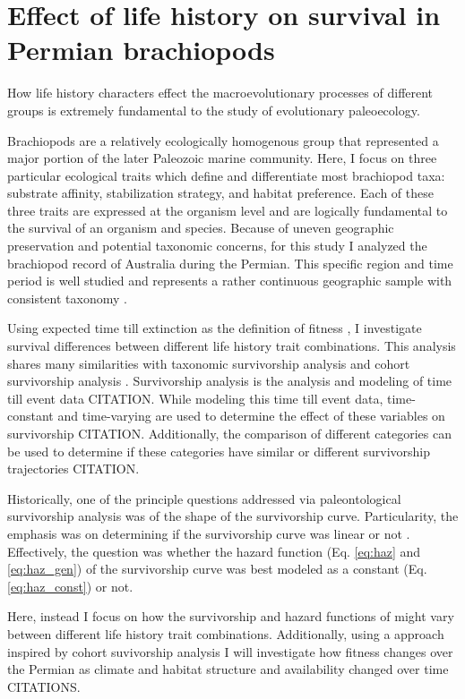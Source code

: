 \documentclass[12pt,letterpaper]{article}
\begin{document}
\section{Effect of life history on survival in Permian brachiopods}

How life history characters effect the macroevolutionary processes of different groups is extremely fundamental to the study of evolutionary paleoecology.

Brachiopods are a relatively ecologically homogenous group that represented a major portion of the later Paleozoic marine community. Here, I focus on three particular ecological traits which define and differentiate most brachiopod taxa: substrate affinity, stabilization strategy, and habitat preference. Each of these three traits are expressed at the organism level and are logically fundamental to the survival of an organism and species. Because of uneven geographic preservation and potential taxonomic concerns, for this study I analyzed the brachiopod record of Australia during the Permian. This specific region and time period is well studied and represents a rather continuous geographic sample with consistent taxonomy \citep{Clapham2008a,Clapham2012,Clapham2007}.

Using expected time till extinction as the definition of fitness \citep{Cooper1984}, I investigate survival differences between different life history trait combinations. This analysis shares many similarities with taxonomic survivorship analysis \citep{VanValen1973,VanValen1979} and cohort survivorship analysis \citep{Raup1978}. Survivorship analysis is the analysis and modeling of time till event data CITATION. While modeling this time till event data, time-constant and time-varying are used to determine the effect of these variables on survivorship CITATION. Additionally, the comparison of different categories can be used to determine if these categories have similar or different survivorship trajectories CITATION.

Historically, one of the principle questions addressed via paleontological survivorship analysis was of the shape of the survivorship curve. Particularity, the emphasis was on determining if the survivorship curve was linear or not \citep{VanValen1973,Raup1975,Sepkoski1975,Pearson1992,Kitchell1991}. Effectively, the question was whether the hazard function (Eq. \ref{eq:haz} and \ref{eq:haz_gen}) of the survivorship curve was best modeled as a constant (Eq. \ref{eq:haz_const}) or not.

Here, instead I focus on how the survivorship and hazard functions of might vary between different life history trait combinations. Additionally, using a approach inspired by cohort suvivorship analysis \citep{Raup1975} I will investigate how fitness changes over the Permian as climate and habitat structure and availability changed over time CITATIONS.




\end{document}
